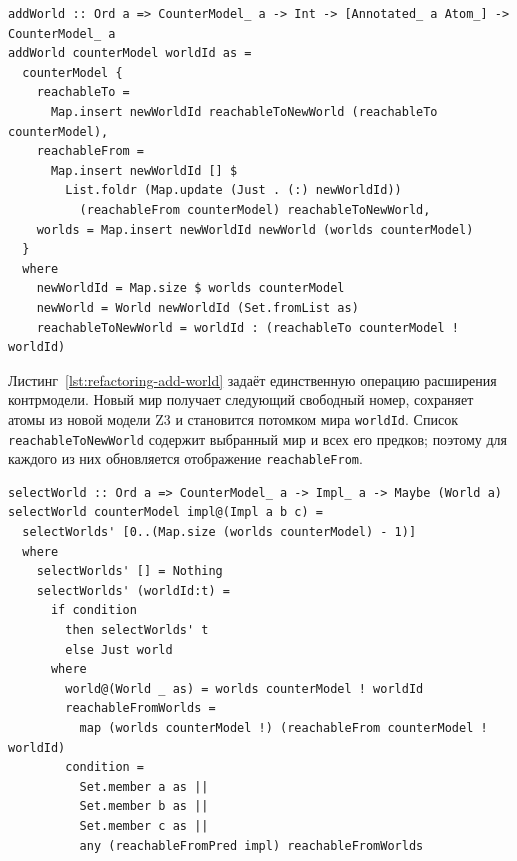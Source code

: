 \documentclass[14pt, russian]{scrartcl}
\begin{document}
\begin{listing}[!htb]
\caption{Добавление нового мира в контрмодель \texttt{addWorld}}
\label{lst:refactoring-add-world}
\begin{verbatim}
addWorld :: Ord a => CounterModel_ a -> Int -> [Annotated_ a Atom_] -> CounterModel_ a
addWorld counterModel worldId as = 
  counterModel {
    reachableTo =
      Map.insert newWorldId reachableToNewWorld (reachableTo counterModel),
    reachableFrom =
      Map.insert newWorldId [] $
        List.foldr (Map.update (Just . (:) newWorldId))
          (reachableFrom counterModel) reachableToNewWorld,
    worlds = Map.insert newWorldId newWorld (worlds counterModel)
  }
  where
    newWorldId = Map.size $ worlds counterModel
    newWorld = World newWorldId (Set.fromList as)
    reachableToNewWorld = worldId : (reachableTo counterModel ! worldId)
\end{verbatim}
\end{listing}

Листинг~\ref{lst:refactoring-add-world} задаёт единственную операцию расширения
контрмодели. Новый мир получает следующий свободный номер, сохраняет атомы из
новой модели Z3 и становится потомком мира \texttt{worldId}. Список
\texttt{reachableToNewWorld} содержит выбранный мир и всех его предков; поэтому
для каждого из них обновляется отображение \texttt{reachableFrom}.

\begin{listing}[!htb]
\caption{Поиск мира, нарушающего импликационную клаузу \texttt{selectWorld}}
\label{lst:refactoring-select-world}
\begin{verbatim}
selectWorld :: Ord a => CounterModel_ a -> Impl_ a -> Maybe (World a)
selectWorld counterModel impl@(Impl a b c) =
  selectWorlds' [0..(Map.size (worlds counterModel) - 1)]
  where
    selectWorlds' [] = Nothing
    selectWorlds' (worldId:t) =
      if condition
        then selectWorlds' t
        else Just world
      where
        world@(World _ as) = worlds counterModel ! worldId
        reachableFromWorlds =
          map (worlds counterModel !) (reachableFrom counterModel ! worldId)
        condition =
          Set.member a as ||
          Set.member b as ||
          Set.member c as ||
          any (reachableFromPred impl) reachableFromWorlds
\end{verbatim}
\end{listing}
\end{document}
